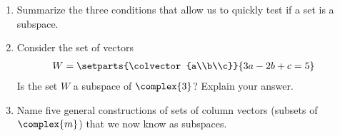 \begin{enumerate}
%
\item Summarize the three conditions that allow us to quickly test if a set is a subspace.
%
\item Consider the set of vectors
%
\begin{align*}
W&=\setparts{\colvector{a\\b\\c}}{3a-2b+c=5}
\end{align*}
%
Is the set $W$ a subspace of $\complex{3}$?  Explain your answer.
%
\item Name five general constructions of sets of column vectors (subsets of $\complex{m}$) that we now know as subspaces.
%
\end{enumerate}